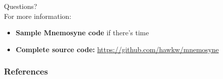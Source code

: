 \documentclass{beamer}
\begin{document}
\begin{frame}
\alert{\huge{Questions?}}\\
\large{For more information:}\normalsize
\begin{itemize}
    \item \textbf{Sample Mnemosyne code} if there's time
    \item \textbf{Complete source code:} \url{https://github.com/hawkw/mnemosyne}
\end{itemize}
\end{frame}

\begin{frame}[t,allowframebreaks]
    \frametitle{\huge{References}}
    \scriptsize
    \printbibliography
\end{frame}
\end{document}

